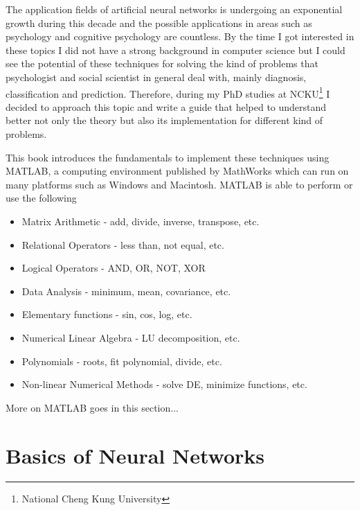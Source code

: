 \documentclass{WileySev}
\begin{document}
\begin{introduction}
The application fields of artificial neural networks is undergoing an exponential growth during this  decade and the possible applications in areas such as psychology and cognitive psychology are countless. By the time I got interested in these topics I did not have a strong background in computer science but I could see the potential of these techniques for solving the kind of problems that psychologist and social scientist in general deal with, mainly diagnosis, classification and prediction. Therefore, during my PhD studies at NCKU\footnote{National Cheng Kung University} I decided to approach this topic and write a guide that helped to understand better not only the theory but also its implementation for different kind of problems. 

This book introduces the fundamentals to implement these techniques using MATLAB, a computing environment published by MathWorks which can run on many platforms such as Windows and Macintosh. MATLAB is able to perform or use the following

\begin{itemize}
  \item Matrix Arithmetic - add, divide, inverse, transpose, etc.
  \item Relational Operators - less than, not equal, etc.
  \item Logical Operators - AND, OR, NOT, XOR
  \item Data Analysis - minimum, mean, covariance, etc.
  \item Elementary functions - sin, cos, log, etc.
  \item Numerical Linear Algebra - LU decomposition, etc.
  \item Polynomials - roots, fit polynomial, divide, etc.
  \item Non-linear Numerical Methods - solve DE, minimize functions, etc.
\end{itemize}

More on MATLAB goes in this section...

\end{introduction}

\part[1 Theory and Fundamentals of Neural Networks]
{Basics of Neural Networks}
\end{document}
